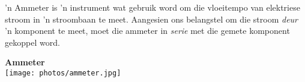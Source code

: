 \begin{minipage}{.5\textwidth}
 'n Ammeter is 'n instrument wat gebruik word om die vloeitempo van elektriese
stroom in 'n stroombaan te meet. Aangesien ons belangstel om die stroom
\textit{deur} 'n komponent te meet, moet die ammeter in \textit{serie} met die
gemete komponent gekoppel word.
\begin{center}
\label{fig:p:em:ec10:ammeter}
\end{center}
\end{minipage}
\begin{minipage}{.5\textwidth}
\begin{center}
\textbf{Ammeter}\\
\texttt{[image: photos/ammeter.jpg]}\\
\end{center}  
\end{minipage}

